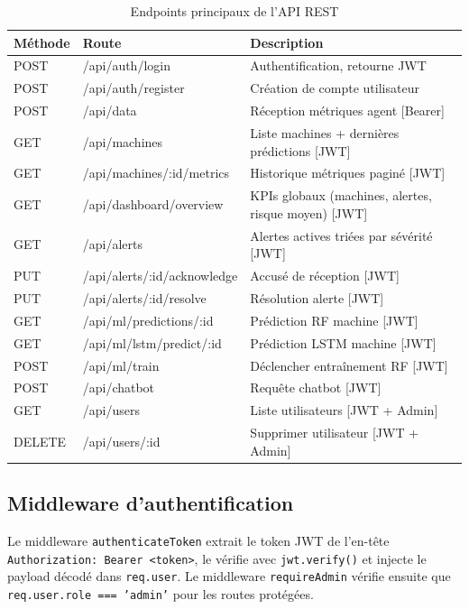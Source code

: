 \begin{table}[H]
\centering
\caption{Endpoints principaux de l'API REST}
\begin{tabularx}{\textwidth}{|l|l|X|}
\hline
\rowcolor{lightblue}
\textbf{Méthode} & \textbf{Route} & \textbf{Description} \\
\hline
POST & /api/auth/login & Authentification, retourne JWT \\
\hline
POST & /api/auth/register & Création de compte utilisateur \\
\hline
POST & /api/data & Réception métriques agent [Bearer] \\
\hline
GET & /api/machines & Liste machines + dernières prédictions [JWT] \\
\hline
GET & /api/machines/:id/metrics & Historique métriques paginé [JWT] \\
\hline
GET & /api/dashboard/overview & KPIs globaux (machines, alertes, risque moyen) [JWT] \\
\hline
GET & /api/alerts & Alertes actives triées par sévérité [JWT] \\
\hline
PUT & /api/alerts/:id/acknowledge & Accusé de réception [JWT] \\
\hline
PUT & /api/alerts/:id/resolve & Résolution alerte [JWT] \\
\hline
GET & /api/ml/predictions/:id & Prédiction RF machine [JWT] \\
\hline
GET & /api/ml/lstm/predict/:id & Prédiction LSTM machine [JWT] \\
\hline
POST & /api/ml/train & Déclencher entraînement RF [JWT] \\
\hline
POST & /api/chatbot & Requête chatbot [JWT] \\
\hline
GET & /api/users & Liste utilisateurs [JWT + Admin] \\
\hline
DELETE & /api/users/:id & Supprimer utilisateur [JWT + Admin] \\
\hline
\end{tabularx}
\end{table}

\subsection{Middleware d'authentification}

Le middleware \texttt{authenticateToken} extrait le token JWT de l'en-tête
\texttt{Authorization: Bearer <token>}, le vérifie avec \texttt{jwt.verify()} et
injecte le payload décodé dans \texttt{req.user}. Le middleware \texttt{requireAdmin}
vérifie ensuite que \texttt{req.user.role === 'admin'} pour les routes protégées.


